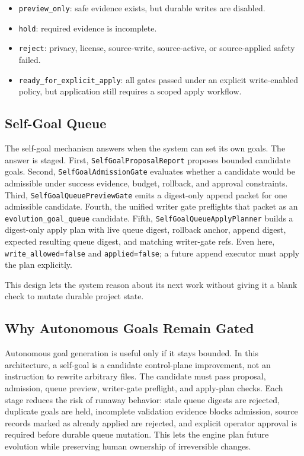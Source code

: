 \documentclass[10pt]{article}
\begin{document}
\begin{itemize}[leftmargin=*]
  \item \texttt{preview\_only}: safe evidence exists, but durable writes are
  disabled.
  \item \texttt{hold}: required evidence is incomplete.
  \item \texttt{reject}: privacy, license, source-write, source-active, or
  source-applied safety failed.
  \item \texttt{ready\_for\_explicit\_apply}: all gates passed under an explicit
  write-enabled policy, but application still requires a scoped apply workflow.
\end{itemize}

\subsection{Self-Goal Queue}

The self-goal mechanism answers when the system can set its own goals. The
answer is staged. First, \texttt{SelfGoalProposalReport} proposes bounded
candidate goals. Second, \texttt{SelfGoalAdmissionGate} evaluates whether a
candidate would be admissible under success evidence, budget, rollback, and
approval constraints. Third, \texttt{SelfGoalQueuePreviewGate} emits a
digest-only append packet for one admissible candidate. Fourth, the unified
writer gate preflights that packet as an \texttt{evolution\_goal\_queue}
candidate. Fifth, \texttt{SelfGoalQueueApplyPlanner} builds a digest-only apply
plan with live queue digest, rollback anchor, append digest, expected resulting
queue digest, and matching writer-gate refs. Even here,
\texttt{write\_allowed=false} and \texttt{applied=false}; a future append
executor must apply the plan explicitly.

This design lets the system reason about its next work without giving it a
blank check to mutate durable project state.

\subsection{Why Autonomous Goals Remain Gated}

Autonomous goal generation is useful only if it stays bounded. In this
architecture, a self-goal is a candidate control-plane improvement, not an
instruction to rewrite arbitrary files. The candidate must pass proposal,
admission, queue preview, writer-gate preflight, and apply-plan checks. Each
stage reduces the risk of runaway behavior: stale queue digests are rejected,
duplicate goals are held, incomplete validation evidence blocks admission,
source records marked as already applied are rejected, and explicit operator
approval is required before durable queue mutation. This lets the engine plan
future evolution while preserving human ownership of irreversible changes.
\end{document}
